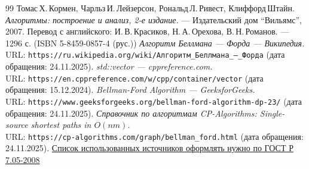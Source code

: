 \begin{thebibliography}{99}
Томас\,Х.\,Кормен, Чарльз\,И.\,Лейзерсон, Рональд\,Л.\,Ривест, Клиффорд\,Штайн.
{\itshape Алгоритмы: построение и анализ, 2-е издание.} --- Издательский дом \enquote{Вильямс}, 2007. Перевод с английского: И.\,В.\,Красиков, Н.\,А.\,Орехова, В.\,Н.\,Романов. --- 1296 с. (ISBN 5-8459-0857-4 (рус.))
{\itshape Алгоритм Беллмана — Форда — Википедия.} \\URL: \texttt{https://ru.wikipedia.org/wiki/Алгоритм\_Беллмана\_—\_Форда} (дата обращения: 24.11.2025).
{\itshape std::vector — cppreference.com.} \\URL: \texttt{https://en.cppreference.com/w/cpp/container/vector} (дата обращения: 15.12.2024).
{\itshape Bellman-Ford Algorithm — GeeksforGeeks.} \\URL: \texttt{https://www.geeksforgeeks.org/bellman-ford-algorithm-dp-23/} (дата обращения: 24.11.2025).
{\itshape Справочник по алгоритмам CP-Algorithms: Single-source shortest paths in $O(nm)$.} \\URL: \texttt{https://cp-algorithms.com/graph/bellman\_ford.html} (дата обращения: 24.11.2025).
\href{http://www.ifap.ru/library/gost/7052008.pdf}{Список использованных источников оформлять нужно по  ГОСТ Р 7.05-2008}
\end{thebibliography}
\pagebreak


